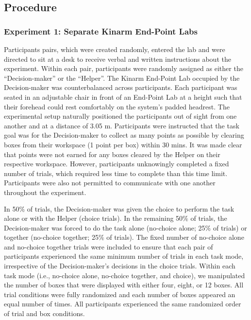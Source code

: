 \documentclass[
  11pt,
  letterpaper,
]{article}
\begin{document}
\clearpage

\subsection{Procedure}\label{procedure}

\subsubsection{Experiment 1: Separate Kinarm End-Point
Labs}\label{experiment-1-separate-kinarm-end-point-labs}

Participants pairs, which were created randomly, entered the lab and
were directed to sit at a desk to receive verbal and written
instructions about the experiment. Within each pair, participants were
randomly assigned as either the ``Decision-maker'' or the ``Helper''.
The Kinarm End-Point Lab occupied by the Decision-maker was
counterbalanced across participants. Each participant was seated in an
adjustable chair in front of an End-Point Lab at a height such that
their forehead could rest comfortably on the system's padded headrest.
The experimental setup naturally positioned the participants out of
sight from one another and at a distance of 3.05 m. Participants were
instructed that the task goal was for the Decision-maker to collect as
many points as possible by clearing boxes from their workspace (1 point
per box) within 30 mins. It was made clear that points were not earned
for any boxes cleared by the Helper on their respective workspace.
However, participants unknowingly completed a fixed number of trials,
which required less time to complete than this time limit. Participants
were also not permitted to communicate with one another throughout the
experiment.

In 50\% of trials, the Decision-maker was given the choice to perform
the task alone or with the Helper (choice trials). In the remaining 50\%
of trials, the Decision-maker was forced to do the task alone (no-choice
alone; 25\% of trials) or together (no-choice together; 25\% of trials).
The fixed number of no-choice alone and no-choice together trials were
included to ensure that each pair of participants experienced the same
minimum number of trials in each task mode, irrespective of the
Decision-maker's decisions in the choice trials. Within each task mode
(i.e., no-choice alone, no-choice together, and choice), we manipulated
the number of boxes that were displayed with either four, eight, or 12
boxes. All trial conditions were fully randomized and each number of
boxes appeared an equal number of times. All participants experienced
the same randomized order of trial and box conditions.
\end{document}
